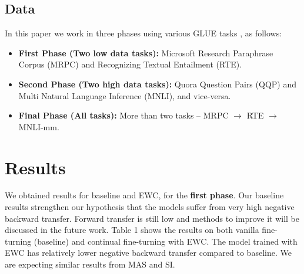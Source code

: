 \documentclass[11pt,a4paper]{article}
\begin{document}
\subsection{Data}
\label{sec:data}

In this paper we work in three phases using various GLUE tasks \cite{wang2019glue}, as follows:
\begin{itemize}
  \item \textbf{First Phase (Two low data tasks):} Microsoft Research Paraphrase Corpus (MRPC) and Recognizing Textual Entailment (RTE).
  \item \textbf{Second Phase (Two high data tasks):} Quora Question Pairs (QQP) and Multi Natural Language Inference (MNLI), and vice-versa.
  \item \textbf{Final Phase (All tasks):} More than two tasks -- MRPC $\rightarrow$ RTE $\rightarrow$ MNLI-mm.
\end{itemize}

\section{Results}
\label{sec:results}

We obtained results for baseline and EWC, for the \textbf{first phase}. Our baseline results strengthen our hypothesis that the models suffer from very high negative backward transfer. Forward transfer is still low and methods to improve it will be discussed in the future work.  Table 1 shows the results on both vanilla fine-turning (baseline) and continual fine-turning with EWC.  The model trained with EWC has relatively lower negative backward transfer compared to baseline.  We are expecting similar results from MAS and SI.  





\end{document}
